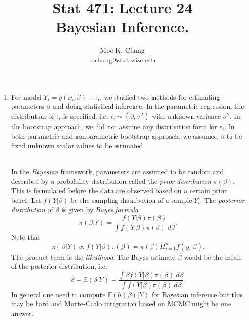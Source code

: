 \documentclass[11pt,twocolumn]{article} %
\begin{document}
\title{Stat 471: Lecture 24\\
Bayesian Inference.}
\author{Moo K. Chung\\
mchung@stat.wisc.edu}
\maketitle \thispagestyle{empty}
\begin{enumerate} 

\item For model $Y_i = g(x_i; \beta) + \epsilon_i$, we studied two methods for estimating parameters $\beta$ and doing statistical inference. In the parametric regression, the distribution of $\epsilon_i$ is specified, i.e. $\epsilon_i \sim (0,\sigma^2)$ with unknown variance $\sigma^2$. In the bootstrap approach, we did not assume any distribution form for $\epsilon_i$. In both parametric and nonparametric bootstrap approach, we assumed $\beta$ to be fixed unknown scalar values to be estimated. 

\\
In the {\em Bayesian} framework, parameters are assumed to be random and described by a probability distribution called the {\em prior distribution} $\pi(\beta)$. This is formulated before the data are observed based on a certain prior belief. Let $f(Y|\beta)$ be the sampling distribution of a sample $Y_i$. The {\em posterior distribution} of $\beta$ is given by {\em Bayes formula}
$$\pi(\beta|Y) = \frac{f(Y|\beta)\pi(\beta)}{\int f(Y|\beta)\pi(\beta)\; d\beta}.$$Note that 
$$\pi(\beta|Y) \propto f(Y|\beta)\pi(\beta)= \pi(\beta)\Pi_{i=1}^n f(y_i|\beta).$$
The product term is the {\em likelihood}. The Bayes estimate $\hat \beta$ would be the mean of the posterior distribution,
i.e. 
$$\hat \beta = \mathbb{E} (\beta|Y)= \frac{\int \beta f(Y|\beta)\pi(\beta) \; d\beta}{\int f(Y|\beta)\pi(\beta) \; d\beta}.$$
In general one need to compute $\mathbb{E}(h(\beta)|Y)$ for Bayesian inference but this may be hard and Monte-Carlo integration based on MCMC might be one answer.


\end{enumerate}
\end{document}

